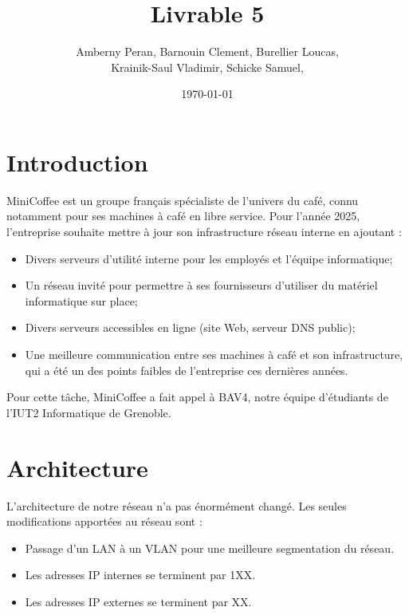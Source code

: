 \documentclass{article}
\title{Livrable 5}
\author{
Amberny Peran, Barnouin Clement, Burellier Loucas, \\
Krainik-Saul Vladimir, Schicke Samuel, 
}
\date{\today}
\begin{document}
\maketitle

\tableofcontents
\clearpage


\section{Introduction}
MiniCoffee est un groupe français spécialiste de l’univers du café, connu notamment pour ses machines à café en libre service. Pour l’année 2025, l’entreprise souhaite mettre à jour son infrastructure réseau interne en ajoutant : 
\begin{itemize}
    \item Divers serveurs d’utilité interne pour les employés et l'équipe informatique;
    \item Un réseau invité pour permettre à ses fournisseurs d’utiliser du matériel informatique sur place;
    \item Divers serveurs accessibles en ligne (site Web, serveur DNS public);
    \item Une meilleure communication entre ses machines à café et son infrastructure, qui a été un des points faibles de l’entreprise ces dernières années.
\end{itemize}
Pour cette tâche, MiniCoffee a fait appel à BAV4, notre équipe d’étudiants de l’IUT2 Informatique de Grenoble.

\section{Architecture}
L'architecture de notre réseau n'a pas énormément changé. 
Les seules modifications apportées au réseau sont : 
\begin{itemize}
    \item Passage d'un LAN à un VLAN pour une meilleure segmentation du réseau.
    \item Les adresses IP internes se terminent par 1XX.
    \item Les adresses IP externes se terminent par XX.
\end{itemize}
\end{document}
